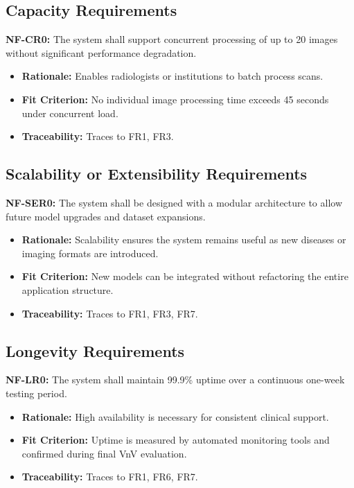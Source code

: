 \documentclass[12pt]{article}
\begin{document}
\subsection{Capacity Requirements}

\textbf{NF-CR0:} The system shall support concurrent processing of up to 20 images without significant performance degradation.
\begin{itemize}
    \item \textbf{Rationale:} Enables radiologists or institutions to batch process scans.
    \item \textbf{Fit Criterion:} No individual image processing time exceeds 45 seconds under concurrent load.
    \item \textbf{Traceability:} Traces to FR1, FR3.
\end{itemize}

\subsection{Scalability or Extensibility Requirements}

\textbf{NF-SER0:} The system shall be designed with a modular architecture to allow future model upgrades and dataset expansions.

\begin{itemize}
    \item \textbf{Rationale:} Scalability ensures the system remains useful as new diseases or imaging formats are introduced.
    \item \textbf{Fit Criterion:} New models can be integrated without refactoring the entire application structure.
    \item \textbf{Traceability:} Traces to FR1, FR3, FR7.
\end{itemize}

\subsection{Longevity Requirements}

\textbf{NF-LR0:} The system shall maintain 99.9\% uptime over a continuous one-week testing period.
\begin{itemize}
    \item \textbf{Rationale:} High availability is necessary for consistent clinical support.
    \item \textbf{Fit Criterion:} Uptime is measured by automated monitoring tools and confirmed during final VnV evaluation.
    \item \textbf{Traceability:} Traces to FR1, FR6, FR7.
\end{itemize}
\end{document}
